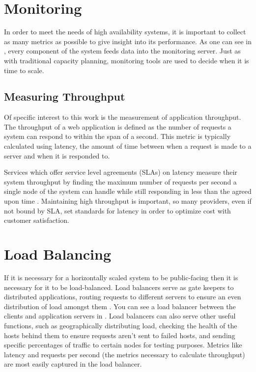 \section{Monitoring}
In order to meet the needs of high availability systems, it is important to collect as many metrics as possible to give insight into its performance. As one can see in , every component of the system feeds data into the monitoring server. Just as with traditional capacity planning, monitoring tools are used to decide when it is time to scale.

\subsection{Measuring Throughput}
Of specific interest to this work is the measurement of application throughput. The throughput of a web application is defined as the number of requests a system can respond to within the span of a second. This metric is typically calculated using latency, the amount of time between when a request is made to a server and when it is responded to.

Services which offer service level agreements (SLAs) on latency measure their system throughput by finding the maximum number of requests per second a single node of the system can handle while still responding in less than the agreed upon time \cite{allspaw2010web}. Maintaining high throughput is important, so many providers, even if not bound by SLA, set standards for latency in order to optimize cost with customer satisfaction.

\section{Load Balancing}
If it is necessary for a horizontally scaled system to be public-facing then it is necessary for it to be load-balanced. Load balancers serve as gate keepers to distributed applications, routing requests to different servers to ensure an even distribution of load amongst them \cite{schlossnagle2006scalable}. You can see a load balancer between the clients and application servers in . Load balancers can also serve other useful functions, such as geographically distributing load, checking the health of the hosts behind them to ensure requests aren't sent to failed hosts, and sending specific percentages of traffic to certain nodes for testing purposes. Metrics like latency and requests per second (the metrics necessary to calculate throughput) are most easily captured in the load balancer.

